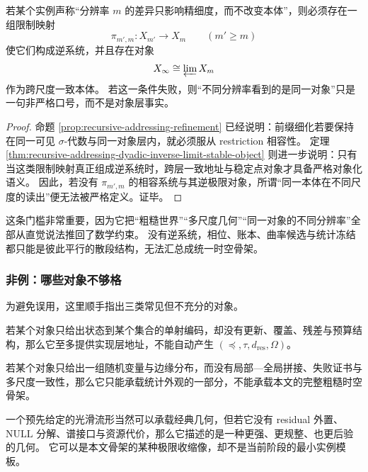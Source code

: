 \begin{proposition}[多尺度一致性门槛]\label{prop:typed-address-biaxial-completion-multiscale-threshold}
若某个实例声称“分辨率 \(m\) 的差异只影响精细度，而不改变本体”，则必须存在一组限制映射
\[
\pi_{m',m}:X_{m'}\to X_m
\qquad (m'\ge m)
\]
使它们构成逆系统，并且存在对象
\[
X_\infty\cong \varprojlim X_m
\]
作为跨尺度一致本体。
若这一条件失败，则“不同分辨率看到的是同一对象”只是一句非严格口号，而不是对象层事实。
\end{proposition}

\begin{proof}
命题 \ref{prop:recursive-addressing-refinement} 已经说明：前缀细化若要保持在同一可见 \(\sigma\)-代数与同一对象层内，就必须服从 restriction 相容性。
定理 \ref{thm:recursive-addressing-dyadic-inverse-limit-stable-object} 则进一步说明：只有当这类限制映射真正组成逆系统时，跨层一致地址与稳定点对象才具备严格对象化语义。
因此，若没有 \(\pi_{m',m}\) 的相容系统与其逆极限对象，所谓“同一本体在不同尺度的读出”便无法被严格定义。证毕。
\end{proof}

这条门槛非常重要，因为它把“粗糙世界”“多尺度几何”“同一对象的不同分辨率”全部从直觉说法推回了数学约束。
没有逆系统，相位、账本、曲率候选与统计冻结都只能是彼此平行的散段结构，无法汇总成统一时空骨架。

\subsubsection{非例：哪些对象不够格}\label{subsubsec:typed-address-biaxial-completion-nonexamples}
为避免误用，这里顺手指出三类常见但不充分的对象。

\begin{remark}[纯集合编码不足]\label{rem:typed-address-biaxial-completion-nonexample-set}
若某个对象只给出状态到某个集合的单射编码，却没有更新、覆盖、残差与预算结构，那么它至多提供实现层地址，不能自动产生 \((\preceq,\tau,d_{\mathrm{res}},\Omega)\)。
\end{remark}

\begin{remark}[纯概率空间不足]\label{rem:typed-address-biaxial-completion-nonexample-probability}
若某个对象只给出一组随机变量与边缘分布，而没有局部—全局拼接、失败证书与多尺度一致性，那么它只能承载统计外观的一部分，不能承载本文的完整粗糙时空骨架。
\end{remark}

\begin{remark}[纯光滑流形不足]\label{rem:typed-address-biaxial-completion-nonexample-manifold}
一个预先给定的光滑流形当然可以承载经典几何，但若它没有 residual 外置、\(\mathrm{NULL}\) 分解、谱接口与资源代价，那么它描述的是一种更强、更规整、也更后验的几何。
它可以是本文骨架的某种极限收缩像，却不是当前阶段的最小实例模板。
\end{remark}


